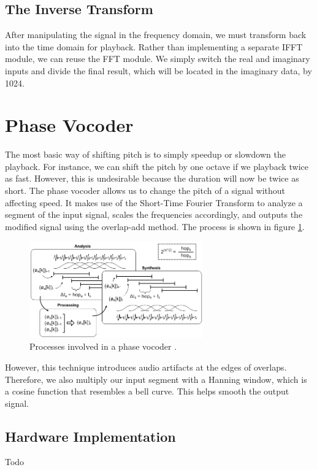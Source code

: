 \documentclass[twoside]{article}
\begin{document}
  
  
  \subsection{The Inverse Transform}
    After manipulating the signal in the frequency domain, we must transform back into the time domain for playback. 
    Rather than implementing a separate IFFT module, we can reuse the FFT module.  We simply switch the real and imaginary
    inputs and divide the final result, which will be located in the imaginary data, by 1024.

%
%
%
%
\section{Phase Vocoder}
  The most basic way of shifting pitch is to simply speedup or slowdown the playback. For instance, we can shift the pitch
  by one octave if we playback twice as fast.  
  However, this is undesirable because the duration will now be twice as short.  
  The phase vocoder allows us to change the pitch of a signal without affecting speed.
  It makes use of the Short-Time Fourier Transform to analyze a segment of the input signal, scales the frequencies accordingly,
  and outputs the modified signal using the overlap-add method. The process is shown in figure \ref{fig:vocoder}.
  \begin{figure}[h]
  \includegraphics[width=75mm]{images/vocoder.png}
  \caption{Processes involved in a phase vocoder \cite{bib:guitarpitchshifter}.}  
  \label{fig:vocoder}
  \end{figure}
  
  However, this technique introduces audio artifacts at the edges of overlaps.  Therefore, we also multiply our input
  segment with a Hanning window, which is a cosine function that resembles a bell curve.  This helps smooth the output
  signal.
  
  \subsection{Hardware Implementation}
  Todo
\end{document}
